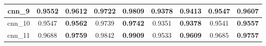 \begin{table}[h]
\begin{tabular} {|c|c|c|c|c|c|c|c|c| }
        cnn\_9   & 0.9552                              & \textbf{0.9612}                     & 0.9722                              & \textbf{0.9809}                & 0.9378                              & \textbf{0.9413}                     & 0.9547                              & \textbf{0.9607}                     \\ \hline
        cnn\_10  & 0.9547                              & \textbf{0.9562}                     & 0.9739                              & \textbf{0.9742}                & 0.9351                              & \textbf{0.9378}                     & 0.9541                              & \textbf{0.9557}                     \\ \hline
        cnn\_11  & 0.9688                              & \textbf{0.9759}                     & 0.9842                              & \textbf{0.9909}                & 0.9533                              & \textbf{0.9609}                     & 0.9685                              & \textbf{0.9757}                     \\ \hline
    \end{tabular}
\end{table}



